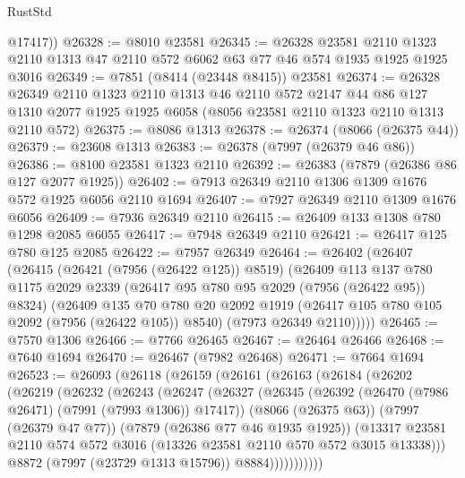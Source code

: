 \begin{lexlean}{RustStd}
\begin{coremodule}
        @17417))
@26328 := @8010 @23581
@26345 := @26328
    @23581
    @2110
    @1323
    @2110
    @1313
    @47
    @2110
    @572
    @6062
    @63
    @77
    @46
    @574
    @1935
    @1925
    @1925
    @3016
@26349 := @7851 (@8414 (@23448 @8415)) @23581
@26374 := @26328
    @26349
    @2110
    @1323
    @2110
    @1313
    @46
    @2110
    @572
    @2147
    @44
    @86
    @127
    @1310
    @2077
    @1925
    @1925
    @6058
    (@8056 @23581 @2110 @1323 @2110 @1313 @2110 @572)
@26375 := @8086 @1313
@26378 := @26374 (@8066 (@26375 @44))
@26379 := @23608 @1313
@26383 := @26378 (@7997 (@26379 @46 @86))
@26386 := @8100 @23581 @1323 @2110
@26392 := @26383 (@7879 (@26386 @86 @127 @2077 @1925))
@26402 := @7913 @26349 @2110 @1306 @1309 @1676 @572 @1925 @6056 @2110 @1694
@26407 := @7927 @26349 @2110 @1309 @1676 @6056
@26409 := @7936 @26349 @2110
@26415 := @26409 @133 @1308 @780 @1298 @2085 @6055
@26417 := @7948 @26349 @2110
@26421 := @26417 @125 @780 @125 @2085
@26422 := @7957 @26349
@26464 := @26402
    (@26407
      (@26415
        (@26421 (@7956 (@26422 @125)) @8519)
        (@26409
          @113
          @137
          @780
          @1175
          @2029
          @2339
          (@26417 @95 @780 @95 @2029 (@7956 (@26422 @95)) @8324)
          (@26409
            @135
            @70
            @780
            @20
            @2092
            @1919
            (@26417 @105 @780 @105 @2092 (@7956 (@26422 @105)) @8540)
            (@7973 @26349 @2110)))))
@26465 := @7570 @1306
@26466 := @7766 @26465
@26467 := @26464 @26466
@26468 := @7640 @1694
@26470 := @26467 (@7982 @26468)
@26471 := @7664 @1694
@26523 := @26093
    (@26118
      (@26159
        (@26161
          (@26163
            (@26184
              (@26202
                (@26219
                  (@26232
                    (@26243
                      (@26247
                        (@26327
                          (@26345
                            (@26392 (@26470 (@7986 @26471) (@7991 (@7993 @1306)) @17417))
                            (@8066 (@26375 @63))
                            (@7997 (@26379 @47 @77))
                            (@7879 (@26386 @77 @46 @1935 @1925))
                            (@13317
                              @23581
                              @2110
                              @574
                              @572
                              @3016
                              (@13326 @23581 @2110 @570 @572 @3015 @13338)))
                          @8872
                          (@7997 (@23729 @1313 @15796))
                          @8884)))))))))))

\end{coremodule}
\end{lexlean}
